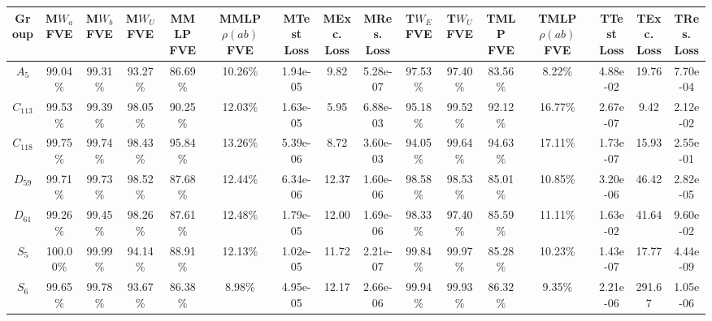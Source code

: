 \begin{tabular}{cccccccccccccccc}
\toprule
    Group & M$W_a$ FVE & M$W_b$ FVE & M$W_U$ FVE & MMLP FVE & MMLP $\rho(ab)$ FVE & MTest Loss & MExc. Loss & MRes. Loss & T$W_E$ FVE & T$W_U$ FVE & TMLP FVE & TMLP $\rho(ab)$ FVE & TTest Loss & TExc. Loss & TRes. Loss \\
\midrule
  $A_{5}$ &    99.04\% &    99.31\% &    93.27\% &  86.69\% &             10.26\% &   1.94e-05 &       9.82 &   5.28e-07 &    97.53\% &    97.40\% &  83.56\% &              8.22\% &   4.88e-02 &      19.76 &   7.70e-04 \\
$C_{113}$ &    99.53\% &    99.39\% &    98.05\% &  90.25\% &             12.03\% &   1.63e-05 &       5.95 &   6.88e-03 &    95.18\% &    99.52\% &  92.12\% &             16.77\% &   2.67e-07 &       9.42 &   2.12e-02 \\
$C_{118}$ &    99.75\% &    99.74\% &    98.43\% &  95.84\% &             13.26\% &   5.39e-06 &       8.72 &   3.60e-03 &    94.05\% &    99.64\% &  94.63\% &             17.11\% &   1.73e-07 &      15.93 &   2.55e-01 \\
 $D_{59}$ &    99.71\% &    99.73\% &    98.52\% &  87.68\% &             12.44\% &   6.34e-06 &      12.37 &   1.60e-06 &    98.58\% &    98.53\% &  85.01\% &             10.85\% &   3.20e-06 &      46.42 &   2.82e-05 \\
 $D_{61}$ &    99.26\% &    99.45\% &    98.26\% &  87.61\% &             12.48\% &   1.79e-05 &      12.00 &   1.69e-06 &    98.33\% &    97.40\% &  85.59\% &             11.11\% &   1.63e-02 &      41.64 &   9.60e-02 \\
  $S_{5}$ &   100.00\% &    99.99\% &    94.14\% &  88.91\% &             12.13\% &   1.02e-05 &      11.72 &   2.21e-07 &    99.84\% &    99.97\% &  85.28\% &             10.23\% &   1.43e-07 &      17.77 &   4.44e-09 \\
  $S_{6}$ &    99.65\% &    99.78\% &    93.67\% &  86.38\% &              8.98\% &   4.95e-05 &      12.17 &   2.66e-06 &    99.94\% &    99.93\% &  86.32\% &              9.35\% &   2.21e-06 &     291.67 &   1.05e-06 \\
\bottomrule
\end{tabular}
